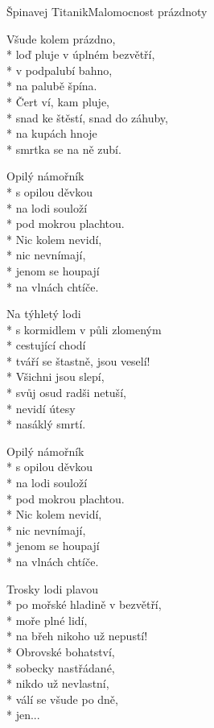 \documentclass[10.5pt]{book}
\begin{document}
\begin{poem}{Špinavej Titanik}{Malomocnost prázdnoty}

\settowidth{\versewidth}{snad ke štěstí, snad do záhuby}

Všude kolem prázdno,\\*
loď pluje v úplném bezvětří,\\*
v podpalubí bahno,\\*
na palubě špína.\\*
Čert ví, kam pluje,\\*
snad ke štěstí, snad do záhuby,\\*
na kupách hnoje\\*
smrtka se na ně zubí.

Opilý námořník\\*
s opilou děvkou\\*
na lodi souloží\\*
pod mokrou plachtou.\\*
Nic kolem nevidí,\\*
nic nevnímají,\\*
jenom se houpají\\*
na vlnách chtíče.

Na týhletý lodi\\*
s kormidlem v půli zlomeným\\*
cestující chodí\\*
tváří se štastně, jsou veselí!\\*
Všichni jsou slepí,\\*
svůj osud radši netuší,\\*
nevidí útesy\\*
nasáklý smrtí.

\vfill\eject

Opilý námořník\\*
s opilou děvkou\\*
na lodi souloží\\*
pod mokrou plachtou.\\*
Nic kolem nevidí,\\*
nic nevnímají,\\*
jenom se houpají\\*
na vlnách chtíče.

Trosky lodi plavou\\*
po mořské hladině v bezvětří,\\*
moře plné lidí,\\*
na břeh nikoho už nepustí!\\*
Obrovské bohatství,\\*
sobecky nastřádané,\\*
nikdo už nevlastní,\\*
válí se všude po dně,\\*
jen...


\end{poem}
\end{document}
